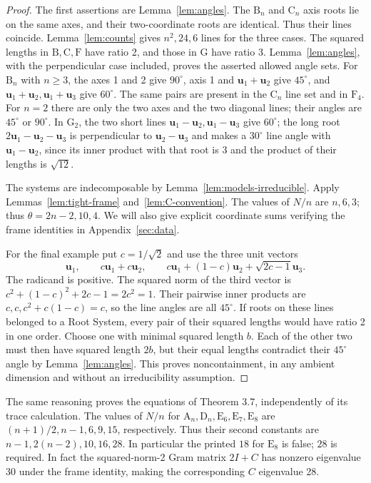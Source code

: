 \documentclass[11pt]{amsart}
\newcommand\Zu{{\mathbf u}}
\theoremstyle{definition}
\newcommand{\typ}[1]{\mathrm{#1}}
\begin{document}
\begin{proof}
The first assertions are Lemma~\ref{lem:angles}.
The $\typ B_n$ and $\typ C_n$ axis roots lie on the same axes, and
their two-coordinate roots are identical. Thus their lines coincide.
Lemma~\ref{lem:counts} gives $n^2,24,6$ lines for the three cases.
The squared lengths in $\typ B,\typ C,\typ F$ have ratio 2, and those
in $\typ G$ have ratio 3. Lemma~\ref{lem:angles}, with the perpendicular
case included, proves the asserted allowed angle sets.
For $\typ B_n$ with $n\geq3$, the axes 1 and 2 give $90^\circ$,
axis 1 and $\Zu_1+\Zu_2$ give $45^\circ$, and
$\Zu_1+\Zu_2,\Zu_1+\Zu_3$ give $60^\circ$.
The same pairs are present in the $\typ C_n$ line set and in $\typ F_4$.
For $n=2$ there are only the two axes and the two diagonal lines; their
angles are $45^\circ$ or $90^\circ$.
In $\typ G_2$, the two short lines
$\Zu_1-\Zu_2,\Zu_1-\Zu_3$ give $60^\circ$;
the long root $2\Zu_1-\Zu_2-\Zu_3$ is perpendicular to
$\Zu_2-\Zu_3$ and makes a $30^\circ$ line angle with
$\Zu_1-\Zu_2$, since its inner product with that root is 3 and
the product of their lengths is $\sqrt{12}$.

The systems are indecomposable by Lemma~\ref{lem:models-irreducible}.
Apply Lemmas~\ref{lem:tight-frame} and~\ref{lem:C-convention}.
The values of $N/n$ are $n,6,3$; thus $\theta=2n-2,10,4$.
We will also give explicit coordinate sums verifying the frame identities
in Appendix~\ref{sec:data}.

For the final example put $c=1/\sqrt2$ and use the three unit vectors
\[
 \Zu_1,\qquad c\Zu_1+c\Zu_2,\qquad
 c\Zu_1+(1-c)\Zu_2+\sqrt{2c-1}\Zu_3.
\]
The radicand is positive. The squared norm of the third vector is
$c^2+(1-c)^2+2c-1=2c^2=1$.
Their pairwise inner products are $c,c,c^2+c(1-c)=c$, so the line angles
are all $45^\circ$. If roots on these lines belonged to a Root System,
every pair of their squared lengths would have ratio 2 in one order.
Choose one with minimal squared length $b$. Each of the other two must
then have squared length $2b$, but their equal lengths contradict their
$45^\circ$ angle by Lemma~\ref{lem:angles}. This proves noncontainment,
in any ambient dimension and without an irreducibility assumption.
\end{proof}

The same reasoning proves the equations of Theorem 3.7, independently of
its trace calculation. The values of $N/n$ for
$\typ A_n,\typ D_n,\typ E_6,\typ E_7,\typ E_8$ are
$(n+1)/2,n-1,6,9,15$, respectively. Thus their second constants are
$n-1,2(n-2),10,16,28$. In particular the printed $18$ for $\typ E_8$
is false; $28$ is required. In fact the squared-norm-2 Gram matrix
$2I+C$ has nonzero eigenvalue 30 under the frame identity, making the
corresponding $C$ eigenvalue 28.
\end{document}
